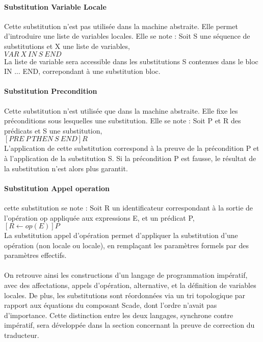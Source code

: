 \paragraph{Substitution Variable Locale}
Cette substitution n'est pas utilisée dans la machine abstraite. Elle permet
d'introduire une liste de variables locales.
Elle se note : Soit S une séquence de substitutions et X une liste de variables,\\
$VAR~ X~ IN~ S~ END$\\
La liste de variable sera accessible dans les substitutions S contenues dans le
bloc IN ... END, correpondant à une substitution bloc.

\paragraph{Substitution Precondition}
Cette substitution n'est utilisée que dans la machine abstraite. Elle fixe les
préconditions sous lesquelles une substitution. Elle se note : Soit P
et R des prédicats et S une substitution,\\ 
$[PRE~ P~ THEN~ S~ END]R$\\
L'application de cette substitution correspond à la preuve de la
précondition P et à l'application de la substitution S. Si la
précondition P est fausse, le résultat de la substitution n'est alors
plus garantit.

\paragraph{Substitution Appel operation}
cette substitution se note : Soit R un identificateur correspondant à la sortie
de l'opération op appliquée aux expressions E, et un prédicat P,\\
$[R\leftarrow op(E)]P$\\
La  substitution appel d’opération permet d’appliquer la substitution
d’une opération (non locale ou locale), en remplaçant les paramètres
formels par des paramètres effectifs. 

\paragraph{}
On retrouve ainsi les constructions d'un langage de programmation
impératif, avec des affectations, appels d'opération, alternative, et la
définition de variables locales. De plus, les substitutions sont
réordonnées via un tri topologique par rapport aux équations du composant
Scade, dont l'ordre n'avait pas d'importance. Cette distinction entre
les deux langages, synchrone contre impératif, sera développée dans la
section concernant la preuve de correction du traducteur.


